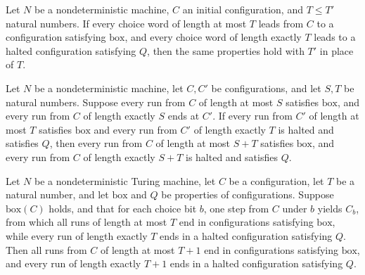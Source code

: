\begin{lemma}
\label{Complexity.LogProg.NGood.mono}
\leanok
{}
Let $N$ be a nondeterministic machine, $C$ an initial configuration, and $T \le T'$
natural numbers. If every choice word of length at most $T$ leads from $C$ to a
configuration satisfying $\mathrm{box}$, and every choice word of length exactly $T$
leads to a halted configuration satisfying $Q$, then the same properties hold with $T'$
in place of $T$.
\end{lemma}

\begin{lemma}
\label{Complexity.LogProg.NGood.seg}
\leanok
{}
Let $N$ be a nondeterministic machine, let $C,C'$ be configurations, and let $S,T$ be
natural numbers. Suppose every run from $C$ of length at most $S$ satisfies
$\mathrm{box}$, and every run from $C$ of length exactly $S$ ends at $C'$. If every run
from $C'$ of length at most $T$ satisfies $\mathrm{box}$ and every run from $C'$ of
length exactly $T$ is halted and satisfies $Q$, then every run from $C$ of length at
most $S+T$ satisfies $\mathrm{box}$, and every run from $C$ of length exactly $S+T$ is
halted and satisfies $Q$.
\end{lemma}

\begin{lemma}
\label{Complexity.LogProg.NGood.choose}
\leanok
{}
Let $N$ be a nondeterministic Turing machine, let $C$ be a configuration, let $T$ be a
natural number, and let $\mathrm{box}$ and $Q$ be properties of configurations. Suppose
$\mathrm{box}(C)$ holds, and that for each choice bit $b$, one step from $C$ under $b$
yields $C_b$, from which all runs of length at most $T$ end in configurations satisfying
$\mathrm{box}$, while every run of length exactly $T$ ends in a halted configuration
satisfying $Q$. Then all runs from $C$ of length at most $T+1$ end in configurations
satisfying $\mathrm{box}$, and every run of length exactly $T+1$ ends in a halted
configuration satisfying $Q$.
\end{lemma}

